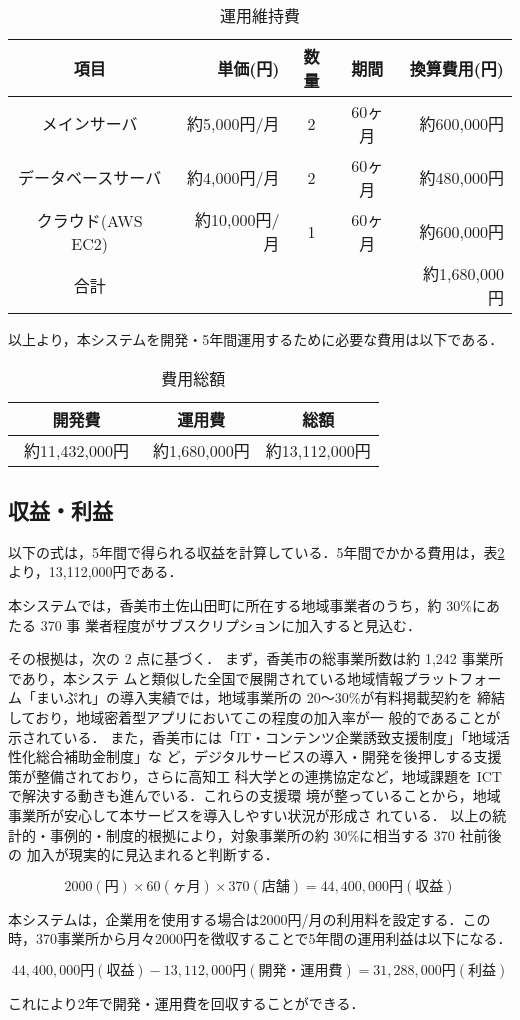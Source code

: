 \begin{table}[h]
  \centering
  \caption{運用維持費}
  \label{fig:Q11}
  \begin{tabular}{crccr}
  \hline
  項目  & 単価(円) & 数量  & 期間 & 換算費用(円) \\ \hline\hline
 
メインサーバ  & 約5,000円/月 & 2& 60ヶ月  & 約600,000円 \\ \hline

データベースサーバ & 約4,000円/月 &2& 60ヶ月 & 約480,000円 \\\hline

クラウド(AWS EC2)  &約10,000円/月&1 &60ヶ月 & 約600,000円 \\ \hline\hline

合計 &  & & & 約1,680,000円\\ \hline
\end{tabular}
\end{table}

以上より，本システムを開発・5年間運用するために必要な費用は以下である．
\begin{table}[h]
  \centering
  \caption{費用総額}
  \label{fig:Q12}
  \begin{tabular}{ccc}
  \hline
  開発費 & 運用費 & 総額  \\ \hline\hline
 約11,432,000円　& 約1,680,000円 & 約13,112,000円\\ \hline

\end{tabular}
\end{table}


\subsection{収益・利益}
以下の式は，5年間で得られる収益を計算している．5年間でかかる費用は，表\ref{fig:Q12}より，13,112,000円である．\par

本システムでは，香美市土佐山田町に所在する地域事業者のうち，約 30\%にあたる 370 事
業者程度がサブスクリプションに加入すると見込む．

その根拠は，次の 2 点に基づく．
まず，香美市の総事業所数は約 1,242 事業所であり\cite{label4}，本システ
ムと類似した全国で展開されている地域情報プラットフォーム「まいぷれ」\cite{label5}の導入実績では，地域事業所の 20〜30\%が有料掲載契約を
締結しており，地域密着型アプリにおいてこの程度の加入率が一
般的であることが示されている．
また，香美市には「IT・コンテンツ企業誘致支援制度」「地域活性化総合補助金制度」な
ど，デジタルサービスの導入・開発を後押しする支援策が整備されており\cite{label6}，さらに高知工
科大学との連携協定など，地域課題を ICT で解決する動きも進んでいる．これらの支援環
境が整っていることから，地域事業所が安心して本サービスを導入しやすい状況が形成さ
れている．
以上の統計的・事例的・制度的根拠により，対象事業所の約 30\%に相当する 370 社前後の
加入が現実的に見込まれると判断する．

\[2000(円)\times 60(ヶ月)\times 370(店舗)=44,400,000円(収益)\]


本システムは，企業用を使用する場合は2000円/月の利用料を設定する．この時，370事業所から月々2000円を徴収することで5年間の運用利益は以下になる．\par

\[44,400,000円(収益)-13,112,000円(開発・運用費)=31,288,000円(利益)\]

これにより2年で開発・運用費を回収することができる．








